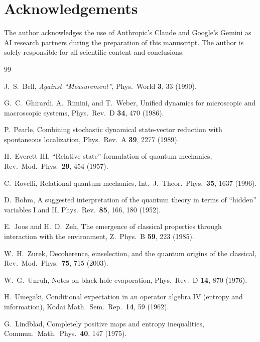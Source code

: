 \documentclass[11pt,twocolumn]{article}
\begin{document}
\section*{Acknowledgements}
The author acknowledges the use of Anthropic's Claude and Google's Gemini
as AI research partners during the preparation of this manuscript.
The author is solely responsible for all scientific content and conclusions.

\begin{thebibliography}{99}

J.~S.~Bell,
\emph{Against ``Measurement''},
Phys.\ World \textbf{3}, 33 (1990).

G.~C.~Ghirardi, A.~Rimini, and T.~Weber,
Unified dynamics for microscopic and macroscopic systems,
Phys.\ Rev.\ D \textbf{34}, 470 (1986).

P.~Pearle,
Combining stochastic dynamical state-vector reduction with spontaneous
localization,
Phys.\ Rev.\ A \textbf{39}, 2277 (1989).

H.~Everett III,
``Relative state'' formulation of quantum mechanics,
Rev.\ Mod.\ Phys.\ \textbf{29}, 454 (1957).

C.~Rovelli,
Relational quantum mechanics,
Int.\ J.\ Theor.\ Phys.\ \textbf{35}, 1637 (1996).

D.~Bohm,
A suggested interpretation of the quantum theory in terms of ``hidden''
variables I and II,
Phys.\ Rev.\ \textbf{85}, 166, 180 (1952).

E.~Joos and H.~D.~Zeh,
The emergence of classical properties through interaction with the
environment,
Z.\ Phys.\ B \textbf{59}, 223 (1985).

W.~H.~Zurek,
Decoherence, einselection, and the quantum origins of the classical,
Rev.\ Mod.\ Phys.\ \textbf{75}, 715 (2003).

W.~G.~Unruh,
Notes on black-hole evaporation,
Phys.\ Rev.\ D \textbf{14}, 870 (1976).

H.~Umegaki,
Conditional expectation in an operator algebra IV (entropy and information),
K\=odai Math.\ Sem.\ Rep.\ \textbf{14}, 59 (1962).

G.~Lindblad,
Completely positive maps and entropy inequalities,
Commun.\ Math.\ Phys.\ \textbf{40}, 147 (1975).


\end{thebibliography}
\end{document}
